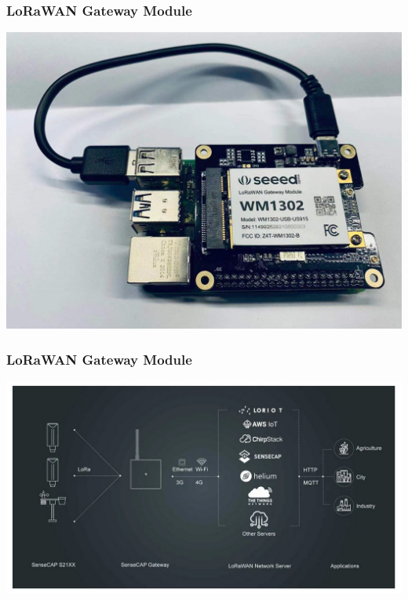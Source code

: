 \documentclass{beamer}
\begin{document}
\begin{frame}
  \frametitle{LoRaWAN Gateway Module}
  \begin{center}
  \includegraphics[scale=0.15]{lorawan-gateway.jpg}
  \end{center}

\end{frame}

\begin{frame}
  \frametitle{LoRaWAN Gateway Module}
  \begin{center}
  \includegraphics[scale=0.2]{lorawann-full-build.jpg}
  \end{center}
\end{frame}
\end{document}
